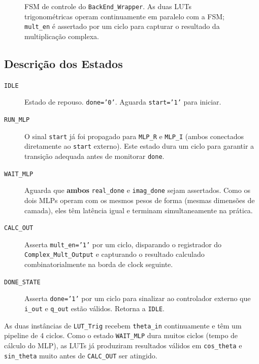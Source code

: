 \documentclass[a4paper,12pt]{article}
\begin{document}
\begin{figure}[H]
\caption{FSM de controle do \texttt{BackEnd\_Wrapper}. As duas LUTs trigonom\'etricas operam continuamente em paralelo com a FSM; \texttt{mult\_en} \'e asserta\-do por um ciclo para capturar o resultado da multiplica\c{c}\~ao complexa.}
\label{fig:backend_fsm}
\end{figure}

\subsection{Descri\c{c}\~ao dos Estados}

\begin{description}
    \item[\texttt{IDLE}] Estado de repouso. \texttt{done='0'}. Aguarda \texttt{start='1'} para iniciar.
    \item[\texttt{RUN\_MLP}] O sinal \texttt{start} j\'a foi propagado para \texttt{MLP\_R} e \texttt{MLP\_I} (ambos conectados diretamente ao \texttt{start} externo). Este estado dura um ciclo para garantir a transi\c{c}\~ao adequada antes de monitorar \texttt{done}.
    \item[\texttt{WAIT\_MLP}] Aguarda que \textbf{ambos} \texttt{real\_done} e \texttt{imag\_done} sejam asserta\-dos. Como os dois MLPs operam com os mesmos pesos de forma (mesmas dimens\~oes de camada), eles t\^em lat\^encia igual e terminam simultaneamente na pr\'atica.
    \item[\texttt{CALC\_OUT}] Asserta \texttt{mult\_en='1'} por um ciclo, disparando o registrador do \texttt{Complex\_Mult\_Output} e capturando o resultado calculado combinatorialmente na borda de clock seguinte.
    \item[\texttt{DONE\_STATE}] Asserta \texttt{done='1'} por um ciclo para sinalizar ao controlador externo que \texttt{i\_out} e \texttt{q\_out} est\~ao v\'alidos. Retorna a \texttt{IDLE}.
\end{description}

As duas inst\^ancias de \texttt{LUT\_Trig} recebem \texttt{theta\_in} continuamente e t\^em um pipeline de 4 ciclos. Como o estado \texttt{WAIT\_MLP} dura muitos ciclos (tempo de c\'alculo do MLP), as LUTs j\'a produziram resultados v\'alidos em \texttt{cos\_theta} e \texttt{sin\_theta} muito antes de \texttt{CALC\_OUT} ser atingido.
\end{document}
